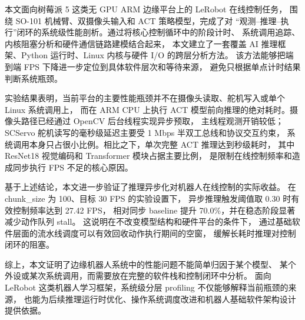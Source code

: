 本文面向树莓派 5 这类无 GPU ARM 边缘平台上的 LeRobot 在线控制任务，
围绕 SO-101 机械臂、双摄像头输入和 ACT 策略模型，完成了对
“观测--推理--执行”闭环的系统级性能剖析。通过将核心控制循环中的阶段计时、
系统调用追踪、内核阻塞分析和硬件通信链路建模结合起来，
本文建立了一套覆盖 AI 推理框架、Python 运行时、Linux 内核与硬件 I/O 的跨层分析方法。
该方法能够把端到端 FPS 下降进一步定位到具体软件层次和等待来源，
避免只根据单点计时结果判断系统瓶颈。

实验结果表明，当前平台的主要性能瓶颈并不在摄像头读取、舵机写入或单个 Linux 系统调用上，
而在 ARM CPU 上执行 ACT 模型前向推理的绝对耗时。摄像头路径已经通过 OpenCV 后台线程实现异步预取，
主线程观测开销较低；SCServo 舵机读写的毫秒级延迟主要受 1 Mbps 半双工总线和协议交互约束，
系统调用本身只占很小比例。相比之下，单次完整 ACT 推理达到秒级耗时，
其中 ResNet18 视觉编码和 Transformer 模块占据主要比例，
是限制在线控制频率和造成同步执行 FPS 不足的核心原因。

基于上述结论，本文进一步验证了推理异步化对机器人在线控制的实际收益。
在 chunk\_size 为 100、目标 30 FPS 的实验设置下，
异步推理触发阈值取 0.30 时有效控制频率达到 27.42 FPS，
相对同步 baseline 提升 70.0\%，并在稳态阶段显著减少动作队列 stall。
这说明在不改变模型结构和硬件平台的条件下，
通过基础软件层面的流水线调度可以有效回收动作执行期间的空窗，
缓解长耗时推理对控制闭环的阻塞。

综上，本文证明了边缘机器人系统中的性能问题不能简单归因于某个模型、
某个外设或某次系统调用，而需要放在完整的软件栈和控制闭环中分析。
面向 LeRobot 这类机器人学习框架，系统级分层 profiling 不仅能够解释当前瓶颈的来源，
也能为后续推理运行时优化、操作系统调度改进和机器人基础软件架构设计提供依据。
